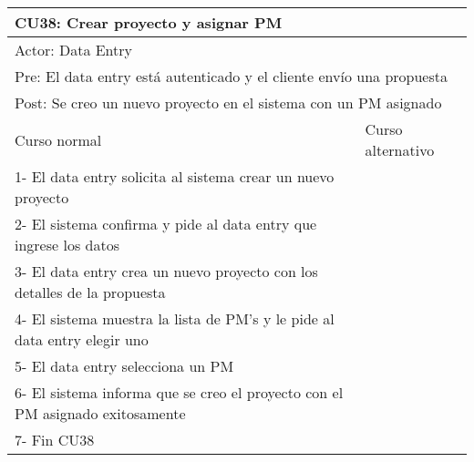 \begin{table}[H]
  \begin{adjustbox}{max width = \textwidth}
  \begin{tabular}{|l|l|}
    \hline
    \multicolumn{2}{|l|}{CU38: Crear proyecto y asignar PM} \\\hline
    \multicolumn{2}{|l|}{Actor: Data Entry} \\\hline
    \multicolumn{2}{|l|}{Pre: El data entry está autenticado y el cliente envío una propuesta} \\\hline
    \multicolumn{2}{|l|}{Post: Se creo un nuevo proyecto en el sistema con un PM asignado} \\\hline
     Curso normal & Curso alternativo\\ \hline
	 1- El data entry solicita al sistema crear un nuevo proyecto & \\ \hline
     2- El sistema confirma y pide al data entry que ingrese los datos & \\ \hline
	 3- El data entry crea un nuevo proyecto con los detalles de la propuesta & \\ \hline
	 4- El sistema muestra la lista de PM's y le pide al data entry elegir uno & \\ \hline
     5- El data entry selecciona un PM & \\ \hline
	 6- El sistema informa que se creo el proyecto con el PM asignado exitosamente & \\ \hline
     7- Fin CU38 & \\ \hline
  \end{tabular}
  \end{adjustbox}
\end{table}


